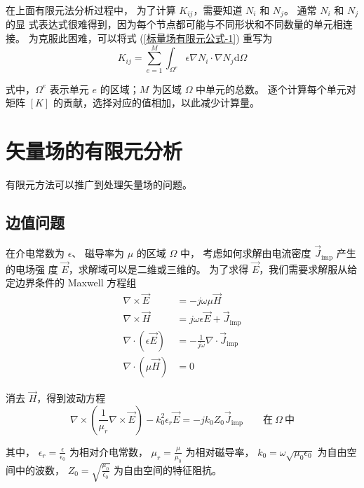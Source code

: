 \par 在上面有限元法分析过程中，
为了计算 $K_{ij}$，需要知道 $N_i$ 和 $N_j$。
通常 $N_i$ 和 $N_j$ 的显
式表达式很难得到，因为每个节点都可能与不同形状和不同数量的单元相连接。
为克服此困难，可以将式 (\ref{标量场有限元公式-1}) 重写为
\begin{equation}
    K_{ij} = 
    \sum_{e=1}^{M}
    \int_{\Omega^e}\epsilon\nabla N_i\cdot\nabla N_j\text{d}\Omega
\end{equation}
\par 式中，$\Omega^e$ 表示单元 $e$ 的区域；$M$ 为区域 $\Omega$ 中单元的总数。
逐个计算每个单元对矩阵 $[K]$ 的贡献，选择对应的值相加，以此减少计算量。

\section{矢量场的有限元分析}

\par 有限元方法可以推广到处理矢量场的问题。

\subsection{边值问题}

\par 在介电常数为 $\epsilon$、
磁导率为 $\mu$ 的区域 $\Omega$ 中，
考虑如何求解由电流密度 $\vec{J}_{\text{imp}}$ 产生的电场强
度 $\vec{E}$，求解域可以是二维或三维的。
为了求得 $\vec{E}$，我们需要求解服从给定边界条件的 Maxwell 方程组
\begin{align}
    \label{Maxwell 频域方程组-1}
    \nabla\times\vec{E}&=-j\omega\mu\vec{H}\\
    \label{Maxwell 频域方程组-2}
    \nabla\times\vec{H}&=j\omega\epsilon\vec{E}+\vec{J}_{\text{imp}}\\
    \label{Maxwell 频域方程组-3}
    \nabla\cdot(\epsilon\vec{E})&=-\frac{1}{j\omega}\nabla\cdot\vec{J}_{\text{imp}}\\
    \label{Maxwell 频域方程组-4}
    \nabla\cdot(\mu\vec{H})&=0
\end{align}
\par 消去 $\vec{H}$，得到波动方程
\begin{equation}
    \nabla\times\left(
        \frac{1}{\mu_r}\nabla\times\vec{E}
    \right)-k_0^2\epsilon_r\vec{E}
    =-jk_0Z_0\vec{J}_{\text{imp}}
    \qquad \text{在}\ \Omega\ \text{中}
    \label{矢量波动方程}
\end{equation}
\par 其中，
$\epsilon_r=\frac{\epsilon}{\epsilon_0}$ 为相对介电常数，
$\mu_r=\frac{\mu}{\mu_0}$ 为相对磁导率，
$k_0=\omega\sqrt{\mu_0\epsilon_0}$ 为自由空间中的波数，
$Z_0=\sqrt{\frac{\mu_0}{\epsilon_0}}$ 为自由空间的特征阻抗。

